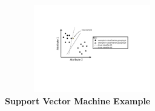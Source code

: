 \documentclass[conference]{IEEEtran}
\begin{document}
\begin{figure}[t]
	\centering
	\includegraphics[height=1.5in, width=3in]{SVM.pdf}
	\caption{\bf Support Vector Machine Example}
	\label{Fig:SVM}
	\vspace{-0.25in}
\end{figure}

\end{document}
